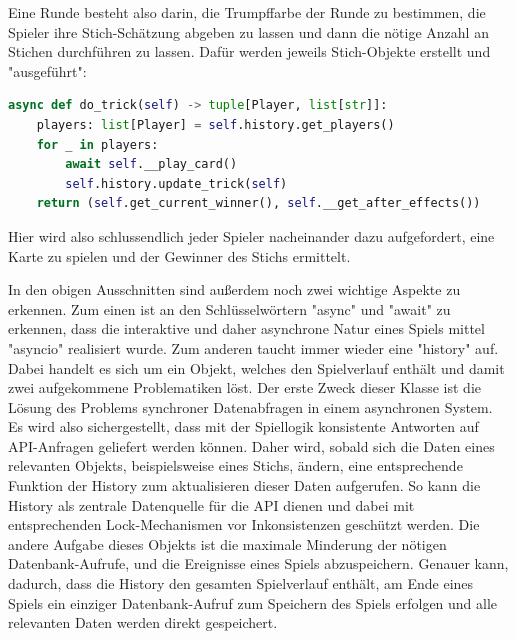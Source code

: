 Eine Runde besteht also darin, die Trumpffarbe der Runde zu bestimmen, die Spieler ihre Stich-Schätzung abgeben zu lassen und dann die nötige Anzahl an Stichen durchführen zu lassen. Dafür werden jeweils Stich-Objekte erstellt und "ausgeführt":

\begin{lstlisting}[language=Python]
async def do_trick(self) -> tuple[Player, list[str]]:
	players: list[Player] = self.history.get_players()
	for _ in players:
		await self.__play_card()
		self.history.update_trick(self)
	return (self.get_current_winner(), self.__get_after_effects())
\end{lstlisting}

Hier wird also schlussendlich jeder Spieler nacheinander dazu aufgefordert, eine Karte zu spielen und der Gewinner des Stichs ermittelt.

In den obigen Ausschnitten sind außerdem noch zwei wichtige Aspekte zu erkennen. Zum einen ist an den Schlüsselwörtern "async" und "await" zu erkennen, dass die interaktive und daher asynchrone Natur eines Spiels mittel "asyncio" realisiert wurde. Zum anderen taucht immer wieder eine "history" auf. Dabei handelt es sich um ein Objekt, welches den Spielverlauf enthält und damit zwei aufgekommene Problematiken löst. Der erste Zweck dieser Klasse ist die Lösung des Problems synchroner Datenabfragen in einem asynchronen System. Es wird also sichergestellt, dass mit der Spiellogik konsistente Antworten auf API-Anfragen geliefert werden können. Daher wird, sobald sich die Daten eines relevanten Objekts, beispielsweise eines Stichs, ändern, eine entsprechende Funktion der History zum aktualisieren dieser Daten aufgerufen. So kann die History als zentrale Datenquelle für die API dienen und dabei mit entsprechenden Lock-Mechanismen vor Inkonsistenzen geschützt werden. Die andere Aufgabe dieses Objekts ist die maximale Minderung der nötigen Datenbank-Aufrufe, und die Ereignisse eines Spiels abzuspeichern. Genauer kann, dadurch, dass die History den gesamten Spielverlauf enthält, am Ende eines Spiels ein einziger Datenbank-Aufruf zum Speichern des Spiels erfolgen und alle relevanten Daten werden direkt gespeichert.

